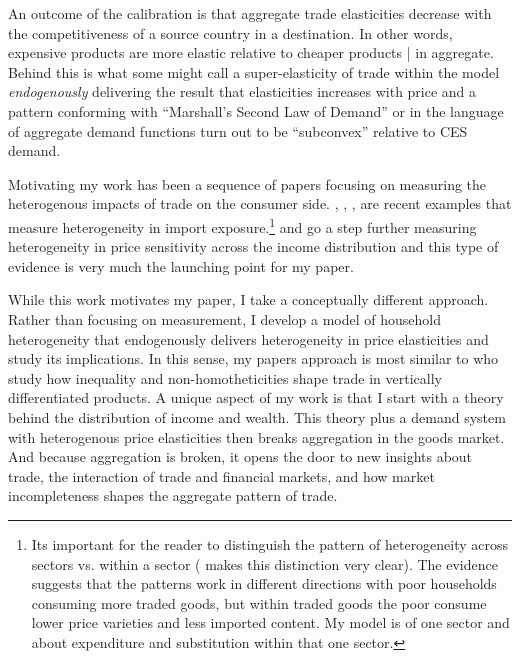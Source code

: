 \documentclass[12pt,pdftex]{article}
\begin{document}
\begin{onehalfspacing}
An outcome of the calibration is that aggregate trade elasticities decrease with the competitiveness of a source country in a destination. In other words, expensive products are more elastic relative to cheaper products | in aggregate. Behind this is what some might call a super-elasticity of trade within the model \emph{endogenously} delivering the result that elasticities increases with price and a pattern conforming with ``Marshall's Second Law of Demand'' or in the language of \citet{mrazova2017not} aggregate demand functions turn out to be ``subconvex'' relative to CES demand.



Motivating my work has been a sequence of papers focusing on measuring the heterogenous impacts of trade on the consumer side. \citet{fajgelbaum2016measuring}, \citet{carroll2020heterogeneous}, \citet{borusyak2021distributional}, \citet{jaccardtoronto} are recent examples that measure heterogeneity in import exposure.\footnote{Its important for the reader to distinguish the pattern of heterogeneity across sectors vs. within a sector (\citet{cravino2017distributional} makes this distinction very clear). The evidence suggests that the patterns work in different directions with poor households consuming more traded goods, but within traded goods the poor consume lower price varieties and less imported content. My model is of one sector and about expenditure and substitution within that one sector.} \citet*{auer2022unequal} and \citet*{colicev2022impact} go a step further measuring heterogeneity in price sensitivity across the income distribution and this type of evidence is very much the launching point for my paper.

While this work motivates my paper, I take a conceptually different approach. Rather than focusing on measurement, I develop a model of household heterogeneity that endogenously delivers heterogeneity in price elasticities and study its implications. In this sense, my papers approach is most similar to \citet*{fajgelbaum2011income} who study how inequality and non-homotheticities shape trade in vertically differentiated products. A unique aspect of my work is that I start with a theory behind the distribution of income and wealth. This theory plus a demand system with heterogenous price elasticities then breaks aggregation in the goods market. And because aggregation is broken, it opens the door to new insights about trade, the interaction of trade and financial markets, and how market incompleteness shapes the aggregate pattern of trade.


\end{onehalfspacing}
\end{document}
